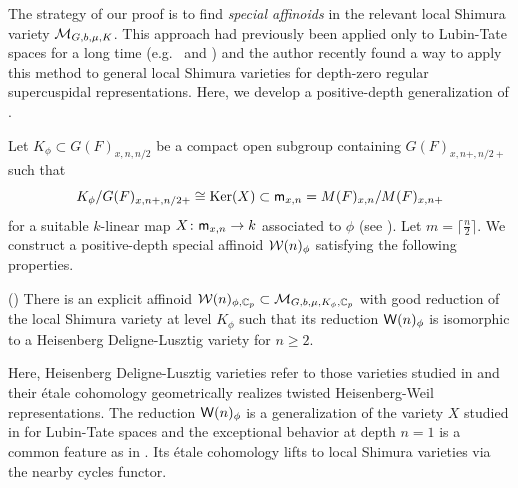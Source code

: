 \documentclass[12pt,reqno]{amsart}
\begin{document}
The strategy of our proof is to find \textit{special affinoids} in the relevant local Shimura variety ${\mathcal{M}}_{G, b, \mu, K}$. This approach had previously been applied only to Lubin-Tate spaces for a long time (e.g.\ \cite{Yos10} and \cite{BW16}) and the author \cite{Tak25z} recently found a way to apply this method to general local Shimura varieties for depth-zero regular supercuspidal representations. Here, we develop a positive-depth generalization of \cite{Tak25z}. 

Let $K_\phi \subset G(F)_{x, n, n/2}$ be a compact open subgroup containing $G(F)_{x, n+, n/2 +}$ such that 
\[
    K_\phi / G(F)_{x, n+, n/2+} \cong {\operatorname{Ker}}(X) \subset {\mathsf{m}}_{x, n} = M(F)_{x, n} / M(F)_{x, n+}
\]
for a suitable $k$-linear map $X\colon {\mathsf{m}}_{x, n} \to k$ associated to $\phi$ (see ). Let $m = \lceil \tfrac{n}{2} \rceil$. We construct a positive-depth special affinoid ${\mathcal{W}}(n)_\phi$ satisfying the following properties. 

\begin{thm2} \textup{()} \label{thm2:HDLV_as_reductions}
    There is an explicit affinoid ${\mathcal{W}}(n)_{\phi, \mathbb{C}_p} \subset {\mathcal{M}}_{G, b, \mu, K_\phi, \mathbb{C}_p}$ with good reduction of the local Shimura variety at level $K_\phi$ such that its reduction ${\mathsf{W}}(n)_\phi$ is isomorphic to a Heisenberg Deligne-Lusztig variety for $n \geq 2$. 
\end{thm2}

Here, Heisenberg Deligne-Lusztig varieties refer to those varieties  studied in \cite[Theorem 6]{Tak26_Yu} and their \'{e}tale cohomology geometrically realizes twisted Heisenberg-Weil representations. The reduction ${\mathsf{W}}(n)_\phi$ is a generalization of the variety $X$ studied in \cite{BW16} for Lubin-Tate spaces and the exceptional behavior at depth $n = 1$ is a common feature as in \cite{BW16}. Its \'{e}tale cohomology  lifts to local Shimura varieties via the nearby cycles functor. 
\end{document}
